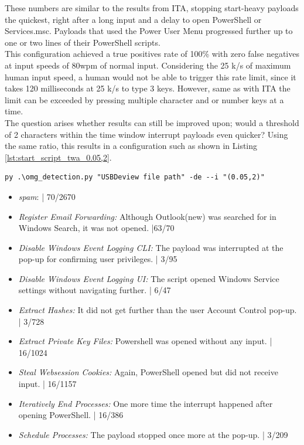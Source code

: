 These numbers are similar to the results from ITA, stopping start-heavy payloads the quickest, right after a long input and a delay to open PowerShell or Services.msc. Payloads that used the Power User Menu progressed further up to one or two lines of their PowerShell scripts. \\
This configuration achieved a true positives rate of 100\% with zero false negatives at input speeds of 80wpm of normal input. Considering the 25 k/s of maximum human input speed, a human would not be able to trigger this rate limit, since it takes 120 milliseconds at 25 k/s to type 3 keys. However, same as with ITA the limit can be exceeded by pressing multiple character and or number keys at a time. \\
The question arises whether results can still be improved upon; would a threshold of 2 characters within the time window interrupt payloads even quicker? Using the same ratio, this results in a configuration such as shown in Listing \ref{lst:start_script_twa_0.05,2}. 


\begin{lstlisting}[caption={start defence Script with TWA (0.05,2)},label={lst:start_script_twa_0.05,2}, captionpos=b]
 py .\omg_detection.py "USBDeview file path" -de --i "(0.05,2)"
\end{lstlisting}

\begin{itemize}
    \item  \emph{spam}:  | 70/2670
    \item  \emph{Register Email Forwarding:} Although Outlook(new) was searched for in Windows Search, it was not opened.  |63/70 
    \item  \emph{Disable Windows Event Logging CLI:} The payload was interrupted at the pop-up for confirming user privileges. | 3/95
    \item  \emph{Disable Windows Event Logging UI:} The script opened Windows Service settings without navigating further.  | 6/47
    \item  \emph{Extract Hashes:} It did not get further than the user Account Control pop-up. | 3/728 
    \item  \emph{Extract Private Key Files:} Powershell was opened without any input. | 16/1024
    \item  \emph{Steal Websession Cookies:} Again, PowerShell opened but did not receive input. | 16/1157
    \item  \emph{Iteratively End Processes:} One more time the interrupt happened after opening PowerShell.  | 16/386
    \item  \emph{Schedule Processes:}  The payload stopped once more at the pop-up. | 3/209
\end{itemize}


